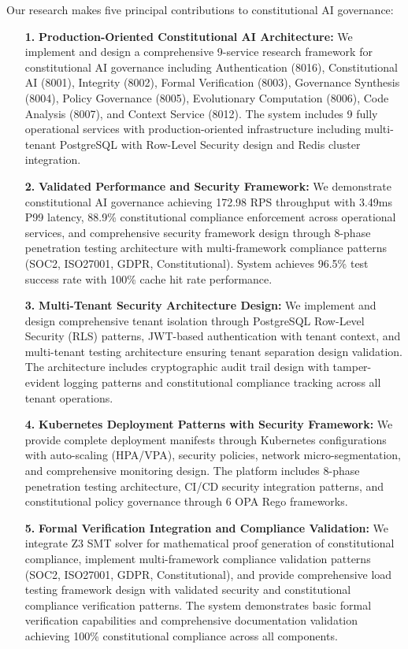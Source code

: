 \documentclass[manuscript,screen,9pt]{acmart}
\begin{document}
Our research makes five principal contributions to constitutional AI governance:
\begin{enumerate}[leftmargin=*,itemsep=2pt,parsep=1pt]
	\item[\textbf{1.}] \textbf{Production-Oriented Constitutional AI Architecture:} We implement and design a comprehensive 9-service research framework for constitutional AI governance including Authentication (8016), Constitutional AI (8001), Integrity (8002), Formal Verification (8003), Governance Synthesis (8004), Policy Governance (8005), Evolutionary Computation (8006), Code Analysis (8007), and Context Service (8012). The system includes 9 fully operational services with production-oriented infrastructure including multi-tenant PostgreSQL with Row-Level Security design and Redis cluster integration.

	\item[\textbf{2.}] \textbf{Validated Performance and Security Framework:} We demonstrate constitutional AI governance achieving 172.98 RPS throughput with 3.49ms P99 latency, 88.9\% constitutional compliance enforcement across operational services, and comprehensive security framework design through 8-phase penetration testing architecture with multi-framework compliance patterns (SOC2, ISO27001, GDPR, Constitutional). System achieves 96.5\% test success rate with 100\% cache hit rate performance.

	\item[\textbf{3.}] \textbf{Multi-Tenant Security Architecture Design:} We implement and design comprehensive tenant isolation through PostgreSQL Row-Level Security (RLS) patterns, JWT-based authentication with tenant context, and multi-tenant testing architecture ensuring tenant separation design validation. The architecture includes cryptographic audit trail design with tamper-evident logging patterns and constitutional compliance tracking across all tenant operations.

	\item[\textbf{4.}] \textbf{Kubernetes Deployment Patterns with Security Framework:} We provide complete deployment manifests through Kubernetes configurations with auto-scaling (HPA/VPA), security policies, network micro-segmentation, and comprehensive monitoring design. The platform includes 8-phase penetration testing architecture, CI/CD security integration patterns, and constitutional policy governance through 6 OPA Rego frameworks.

	\item[\textbf{5.}] \textbf{Formal Verification Integration and Compliance Validation:} We integrate Z3 SMT solver for mathematical proof generation of constitutional compliance, implement multi-framework compliance validation patterns (SOC2, ISO27001, GDPR, Constitutional), and provide comprehensive load testing framework design with validated security and constitutional compliance verification patterns. The system demonstrates basic formal verification capabilities and comprehensive documentation validation achieving 100\% constitutional compliance across all components.
\end{enumerate}
\end{document}
